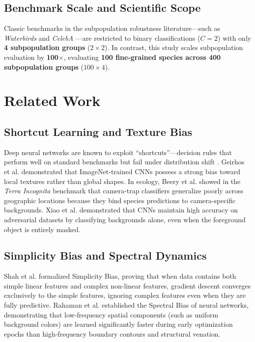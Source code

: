 \documentclass[10pt,journal,compsoc]{IEEEtran}
\begin{document}
\subsection{Benchmark Scale and Scientific Scope}
Classic benchmarks in the subpopulation robustness literature---such as \textit{Waterbirds} \cite{sagawa2020groupdro} and \textit{CelebA} \cite{sagawa2020groupdro}---are restricted to binary classifications ($C = 2$) with only \textbf{4 subpopulation groups} ($2 \times 2$). In contrast, this study scales subpopulation evaluation by \textbf{100$\times$}, evaluating \textbf{100 fine-grained species across 400 subpopulation groups} ($100 \times 4$).

\section{Related Work}

\subsection{Shortcut Learning and Texture Bias}
Deep neural networks are known to exploit ``shortcuts''---decision rules that perform well on standard benchmarks but fail under distribution shift \cite{geirhos2020shortcut}. Geirhos et al. \cite{geirhos2019texture} demonstrated that ImageNet-trained CNNs possess a strong bias toward local textures rather than global shapes. In ecology, Beery et al. \cite{beery2018terraincognita} showed in the \textit{Terra Incognita} benchmark that camera-trap classifiers generalize poorly across geographic locations because they bind species predictions to camera-specific backgrounds. Xiao et al. \cite{xiao2021noise} demonstrated that CNNs maintain high accuracy on adversarial datasets by classifying backgrounds alone, even when the foreground object is entirely masked.

\subsection{Simplicity Bias and Spectral Dynamics}
Shah et al. \cite{shah2020simplicity} formalized Simplicity Bias, proving that when data contains both simple linear features and complex non-linear features, gradient descent converges exclusively to the simple features, ignoring complex features even when they are fully predictive. Rahaman et al. \cite{rahaman2019spectral} established the Spectral Bias of neural networks, demonstrating that low-frequency spatial components (such as uniform background colors) are learned significantly faster during early optimization epochs than high-frequency boundary contours and structural venation.
\end{document}

